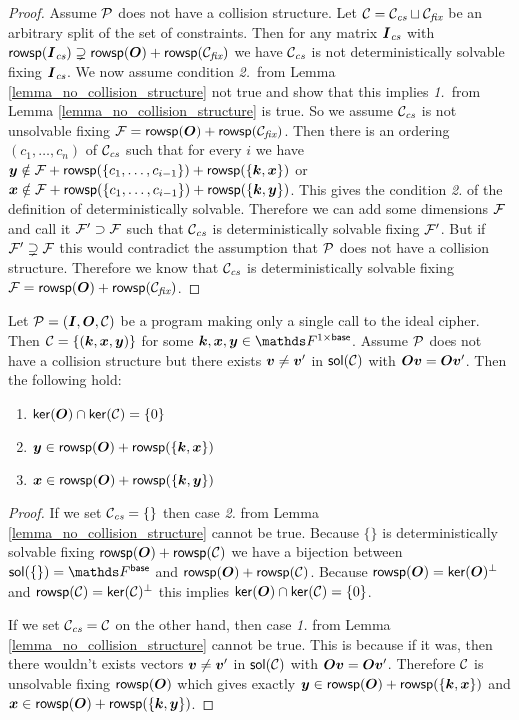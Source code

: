 \begin{proof}
    Assume $\P$ does not have a collision structure.
    Let $\C = \Ccs \sqcup \Cfix$ be an arbitrary split of the set of constraints.
    Then for any matrix $\Ics$ with $\rowsp(\Ics) \supsetneq \rowsp(\O) + \rowsp(\Cfix)$ we have
    $\Ccs$ is not deterministically solvable fixing $\Ics$.
    We now assume condition \textit{2.}~from Lemma \ref{lemma_no_collision_structure} not true
    and show that this implies \textit{1.}~from Lemma \ref{lemma_no_collision_structure} is true.
    So we assume $\Ccs$ is not unsolvable fixing $\Fix = \rowsp(\O) + \rowsp(\Cfix)$.
    Then there is an ordering $(c_1, \dots, c_n)$ of $\Ccs$ such that for every $i$ we have
    $\vy \notin \Fix + \rowsp(\{\dts c {i-1}\}) + \rowsp(\{ \vk, \vx \})$ or
    $\vx \notin \Fix + \rowsp(\{\dts c {i-1}\}) + \rowsp(\{ \vk, \vy \})$.
    This gives the condition \textit{2.} of the definition of deterministically solvable.
    Therefore we can add some dimensions $\Fix$ and call it $\Fix' \supset \Fix$ such that
    $\Ccs$ is deterministically solvable fixing $\Fix'$.
    But if $\Fix' \supsetneq \Fix$ this would contradict the assumption that $\P$ does not have a collision structure.
    Therefore we know that $\Ccs$ is deterministically solvable fixing $\Fix = \rowsp(\O) + \rowsp(\Cfix)$.
\end{proof}

\begin{corollary}
\label{single_query_properties}
    Let $\P = (\I, \O, \C)$ be a program making only a single call to the ideal cipher.
    Then $\C = \{ (\vk, \vx, \vy)\}$ for some $\vk, \vx, \vy \in \Frowsp$.
    Assume $\P$ does not have a collision structure but there exists $\vv \neq \vv'$ in $\sol(\C)$ with $\O\vv = \O\vv'$.
    Then the following hold:
    \begin{enumerate}
    \item $\ker(\O) \cap \ker(\C) = \{0\}$
    \item $\vy \in \rowsp(\O) + \rowsp(\{\vk, \vx\})$
    \item $\vx \in \rowsp(\O) + \rowsp(\{\vk, \vy\})$
    \end{enumerate}
\end{corollary}
\begin{proof}
    If we set $\Ccs = \{\}$ then case \textit{2.} from Lemma \ref{lemma_no_collision_structure} cannot be true.
    Because $\{\}$ is deterministically solvable fixing $\rowsp(\O) + \rowsp(\C)$ we have a bijection between
    $\sol(\{\}) = \Fsp$ and $\rowsp(\O) + \rowsp(\C)$.
    Because $\rowsp(\O) = \ker(\O)^\perp$ and $\rowsp(\C) = \ker(\C)^\perp$
    this implies $\ker(\O) \cap \ker(\C) = \{0\}$.
    
    If we set $\Ccs = \C$ on the other hand,
    then case \textit{1.} from Lemma \ref{lemma_no_collision_structure} cannot be true.
    This is because if it was, then there wouldn't exists vectors $\vv \neq \vv'$ in $\sol(\C)$ with $\O\vv = \O\vv'$.
    Therefore $\C$ is unsolvable fixing $\rowsp(\O)$ which gives exactly 
    $\vy \in \rowsp(\O) + \rowsp(\{\vk, \vx\})$ and
    $\vx \in \rowsp(\O) + \rowsp(\{\vk, \vy\})$.
\end{proof}

